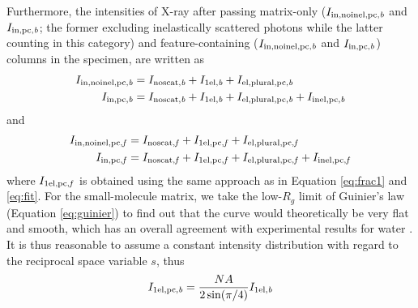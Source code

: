 \documentclass[]{article}
\newcommand\noscatb{\textup{\scriptsize{noscat,\textit b}}}
\newcommand\selb{\textup{\scriptsize{1el,\textit b}}}
\newcommand\inelpcb{\textup{\scriptsize{inel,pc,\textit b}}}
\newcommand\elplpcb{\textup{\scriptsize{el,plural,pc,\textit b}}}
\newcommand\innoinelpcb{\textup{\scriptsize{in,noinel,pc,\textit b}}}
\newcommand\selpcb{\textup{\scriptsize{1el,pc,\textit b}}}
\newcommand\inpcb{\textup{\scriptsize{in,pc,\textit b}}}
\newcommand\noscatf{\textup{\scriptsize{noscat,\textit f}}}
\newcommand\inelpcf{\textup{\scriptsize{inel,pc,\textit f}}}
\newcommand\elplpcf{\textup{\scriptsize{el,plural,pc,\textit f}}}
\newcommand\innoinelpcf{\textup{\scriptsize{in,noinel,pc,\textit f}}}
\newcommand\selpcf{\textup{\scriptsize{1el,pc,\textit f}}}
\newcommand\inpcf{\textup{\scriptsize{in,pc,\textit f}}}
\begin{document}
Furthermore, the intensities of X-ray after passing matrix-only ($I_{\innoinelpcb}$ and $I_{\inpcb}$; the former excluding inelastically scattered photons while the latter counting in this category) and feature-containing ($I_{\innoinelpcb}$ and $I_{\inpcb}$) columns in the specimen, are written as 
\begin{align}
I_{\innoinelpcb} &= I_{\noscatb} + I_{\selb} + I_{\elplpcb} \\
I_{\inpcb} &= I_{\noscatb} + I_{\selb} + I_{\elplpcb} + I_{\inelpcb}
\end{align}
and
\begin{align}
I_{\innoinelpcf} &= I_{\noscatf} + I_{\selpcf} + I_{\elplpcf} \\
I_{\inpcf} &= I_{\noscatf} + I_{\selpcf} + I_{\elplpcf} + I_{\inelpcf}
\end{align}
where $I_{\selpcf}$ is obtained using the same approach as in Equation \ref{eq:frac1} and \ref{eq:fit}. For the small-molecule matrix, we take the low-$R_g$ limit of Guinier's law (Equation \ref{eq:guinier}) to find out that the curve would theoretically be very flat and smooth, which has an overall agreement with experimental results for water \cite{Hedlund:2009ix}. It is thus reasonable to assume a constant intensity distribution with regard to the reciprocal space variable $s$, thus 
\begin{equation}
I_{\selpcb} = \frac{NA}{2\sin(\pi/4)}I_{\selb}
\end{equation}
\end{document}
